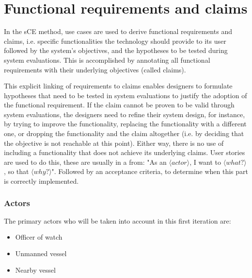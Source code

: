 \section{Functional requirements and claims}
In the sCE method, use cases are used to derive functional requirements and claims, i.e. specific functionalities the technology should provide to its user followed by the system’s objectives, and the hypotheses to be tested during system evaluations. This is accomplished by annotating all functional requirements with their underlying objectives (called claims).

This explicit linking of requirements to claims enables designers to formulate hypotheses that need to be tested in system evaluations to justify the adoption of the functional requirement. If the claim cannot be proven to be valid through system evaluations, the designers need to refine their system design, for instance, by trying to improve the functionality, replacing the functionality with a different one, or dropping the functionality and the claim altogether (i.e. by deciding that the objective is not reachable at this point). Either way, there is no use of including a functionality that does not achieve its underlying claims. User stories are used to do this, these are usually in a from: "As an $\langle actor \rangle$, I want to $\langle what? \rangle$, so that $\langle why? \rangle$". Followed by an acceptance criteria, to determine when this part is correctly implemented.

\subsubsection{Actors}
The primary actors who will be taken into account in this first iteration are:
\begin{itemize}
	\item Officer of watch
	\item Unmanned vessel
	\item Nearby vessel
\end{itemize}


